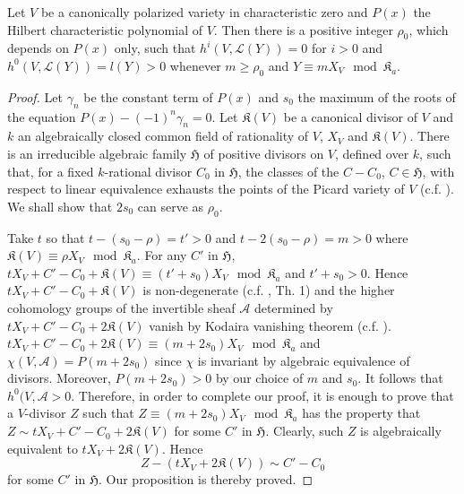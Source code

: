 \begin{proposition}\label{art14-prop1}
Let $V$ be a canonically polarized variety in characteristic zero and $P(x)$ the Hilbert characteristic polynomial of $V$. Then there is a positive integer $\rho_{0}$, which depends on $P(x)$ only, such that $h^{i}(V,\mathscr{L}(Y))=0$ for $i>0$ and $h^{0}(V,\mathscr{L}(Y))=l(Y)>0$ whenever $m\geq \rho_{0}$ and $Y\equiv mX_{V}\mod \mathfrak{K}_{a}$.
\end{proposition}

\begin{proof}
Let $\gamma_{n}$ be the constant term of $P(x)$ and $s_{0}$ the maximum of the roots of the equation $P(x)-(-1)^{n}\gamma_{n}=0$. Let $\mathfrak{K}(V)$ be a canonical divisor of $V$ and $k$ an algebraically closed common field of rationality of $V$, $X_{V}$ and $\mathfrak{K}(V)$. There is an irreducible algebraic family $\mathfrak{H}$ of positive divisors on $V$, defined over $k$, such that, for a fixed $k$-rational divisor $C_{0}$ in $\mathfrak{H}$, the classes of the $C-C_{0}$, $C\in \mathfrak{H}$, with respect to linear equivalence exhausts the points of the Picard variety of $V$ (c.f. \cite{art14-key15}). We shall show that $2s_{0}$ can serve as $\rho_{0}$.

Take $t$ so that $t-(s_{0}-\rho)=t'>0$ and $t-2(s_{0}-\rho)=m>0$ where $\mathfrak{K}(V)\equiv \rho X_{V}\mod \mathfrak{K}_{a}$. For any $C'$ in $\mathfrak{H}$, $tX_{V}+C'-C_{0}+\mathfrak{K}(V)\equiv (t'+s_{0})X_{V}\mod \mathfrak{K}_{a}$ and $t'+s_{0}>0$. Hence $tX_{V}+C'-C_{0}+\mathfrak{K}(V)$ is non-degenerate (c.f. \cite{art14-key16}, Th. 1) and the higher cohomology groups of the invertible sheaf $\mathscr{A}$ determined by $tX_{V}+C'-C_{0}+2\mathfrak{K}(V)$ vanish by Kodaira vanishing theorem (c.f. \cite{art14-key11}). $tX_{V}+C'-C_{0}+2\mathfrak{K}(V)\equiv (m+2s_{0})X_{V}\mod \mathfrak{K}_{a}$ and $\chi(V,\mathscr{A})=P(m+2s_{0})$ since $\chi$ is invariant by algebraic equivalence of divisors. Moreover, $P(m+2s_{0})>0$ by our choice of $m$ and $s_{0}$. It follows that $h^{0}(V,\mathscr{A}>0$. Therefore, in order to complete our proof, it is enough to prove that a $V$-divisor $Z$ such that $Z\equiv (m+2s_{0})X_{V}\mod \mathfrak{K}_{a}$ has the property that $Z\sim tX_{V}+C'-C_{0}+2\mathfrak{K}(V)$ for some $C'$ in $\mathfrak{H}$. Clearly, such $Z$ is algebraically equivalent to $tX_{V}+2\mathfrak{K}(V)$. Hence
$$
Z-(tX_{V}+2\mathfrak{K}(V))\sim C'-C_{0}
$$
for some $C'$ in $\mathfrak{H}$. Our proposition is thereby proved.
\end{proof}

